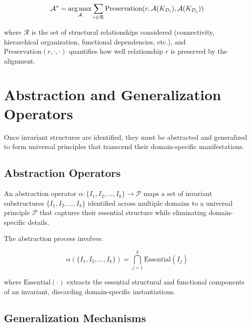 \begin{equation}
\mathcal{A}^* = \mathop{\mathrm{arg\,max}}_{\mathcal{A}} \sum_{r \in \mathcal{R}} \text{Preservation}(r, \mathcal{A}(K_{\mathcal{D}_i}), \mathcal{A}(K_{\mathcal{D}_j}))
\end{equation}

where $\mathcal{R}$ is the set of structural relationships considered (connectivity, hierarchical organization, functional dependencies, etc.), and $\text{Preservation}(r, \cdot, \cdot)$ quantifies how well relationship $r$ is preserved by the alignment.

\section{Abstraction and Generalization Operators}

Once invariant structures are identified, they must be abstracted and generalized to form universal principles that transcend their domain-specific manifestations.



\subsection{Abstraction Operators}

\begin{definition}
An abstraction operator $\alpha: \{I_1, I_2, \ldots, I_k\} \rightarrow \mathcal{P}$ maps a set of invariant substructures $\{I_1, I_2, \ldots, I_k\}$ identified across multiple domains to a universal principle $\mathcal{P}$ that captures their essential structure while eliminating domain-specific details.
\end{definition}

The abstraction process involves:

\begin{equation}
\alpha(\{I_1, I_2, \ldots, I_k\}) = \bigcap_{j=1}^{k} \text{Essential}(I_j)
\end{equation}

where $\text{Essential}(\cdot)$ extracts the essential structural and functional components of an invariant, discarding domain-specific instantiations.

\subsection{Generalization Mechanisms}

